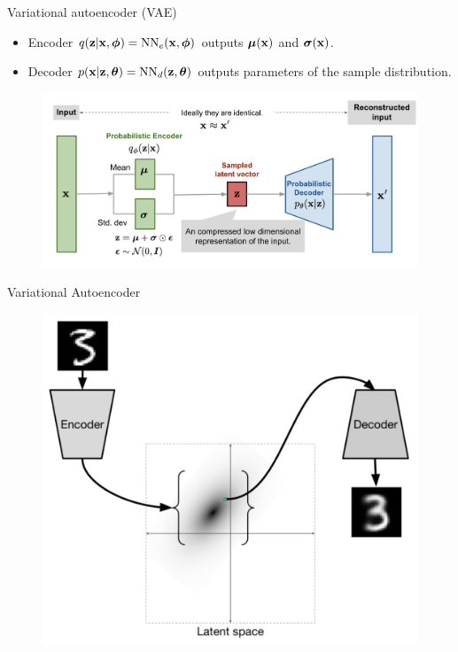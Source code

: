 \begin{frame}{Variational autoencoder (VAE)}
	\begin{itemize}
		\item Encoder $q(\mathbf{z} | \mathbf{x}, \boldsymbol{\phi}) = \text{NN}_e(\mathbf{x}, \boldsymbol{\phi})$ outputs $\boldsymbol{\mu}(\mathbf{x})$ and $\boldsymbol{\sigma}(\mathbf{x})$.
		\item Decoder $p(\mathbf{x} | \mathbf{z}, \boldsymbol{\theta}) = \text{NN}_d(\mathbf{z}, \boldsymbol{\theta})$ outputs parameters of the sample distribution.
	\end{itemize}
	\begin{figure}[h]
		\centering
		\includegraphics[width=\linewidth]{figs/vae-gaussian.png}
	\end{figure}
	
\end{frame}
\begin{frame}{Variational Autoencoder}
	\begin{figure}[h]
		\centering
		\includegraphics[width=.7\linewidth]{figs/VAE.png}
	\end{figure}
\end{frame}
